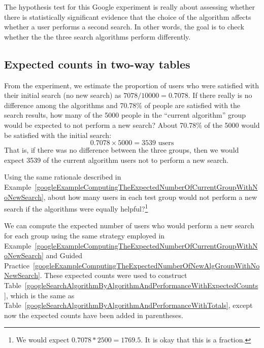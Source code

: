 The hypothesis test for this Google experiment is really about assessing whether there is statistically significant evidence that the choice of the algorithm affects whether a user performs a second search. In other words, the goal is to check whether the the three search algorithms perform differently.


\subsection{Expected counts in two-way tables}

\begin{example}{From the experiment, we estimate the proportion of users who were satisfied with their initial search (no new search) as $7078/10000 = 0.7078$. If there really is no difference among the algorithms and 70.78\% of people are satisfied with the search results, how many of the 5000 people in the ``current algorithm'' group would be expected to not perform a new search?} \label{googleExampleComputingTheExpectedNumberOfCurrentGroupWithNoNewSearch}
About 70.78\% of the 5000 would be satisfied with the initial search:
$$ 0.7078\times 5000 = 3539\text{ users} $$
That is, if there was no difference between the three groups, then we would expect 3539 of the current algorithm users not to perform a new search.
\end{example}

\begin{exercise}\label{googleExampleComputingTheExpectedNumberOfNewAlgGroupWithNoNewSearch}
Using the same rationale described in Example~\ref{googleExampleComputingTheExpectedNumberOfCurrentGroupWithNoNewSearch}, about how many users in each test group would not perform a new search if the algorithms were equally helpful?\footnote{We would expect $0.7078*2500 = 1769.5$. It is okay that this is a fraction.}
\end{exercise}

We can compute the expected number of users who would perform a new search for each group using the same strategy employed in Example~\ref{googleExampleComputingTheExpectedNumberOfCurrentGroupWithNoNewSearch} and Guided Practice~\ref{googleExampleComputingTheExpectedNumberOfNewAlgGroupWithNoNewSearch}. These expected counts were used to construct Table~\ref{googleSearchAlgorithmByAlgorithmAndPerformanceWithExpectedCounts}, which is the same as Table~\ref{googleSearchAlgorithmByAlgorithmAndPerformanceWithTotals}, except now the expected counts have been added in parentheses.

